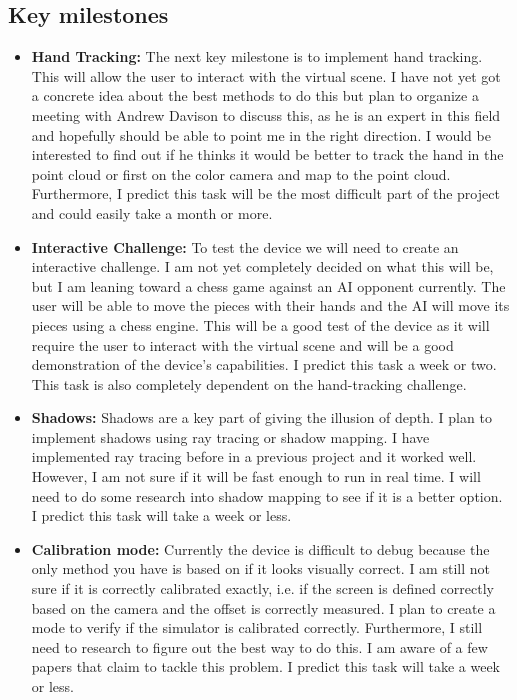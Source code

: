 \subsection{Key milestones}
\begin{itemize}
    \item \textbf{Hand Tracking:} The next key milestone is to implement hand tracking. This will allow the user to interact with the virtual scene. I have not yet got a concrete idea about the best methods to do this but plan to organize a meeting with Andrew Davison to discuss this, as he is an expert in this field and hopefully should be able to point me in the right direction. I would be interested to find out if he thinks it would be better to track the hand in the point cloud or first on the color camera and map to the point cloud. Furthermore, I predict this task will be the most difficult part of the project and could easily take a month or more.

    \item \textbf{Interactive Challenge:} To test the device we will need to create an interactive challenge. I am not yet completely decided on what this will be, but I am leaning toward a chess game against an AI opponent currently. The user will be able to move the pieces with their hands and the AI will move its pieces using a chess engine. This will be a good test of the device as it will require the user to interact with the virtual scene and will be a good demonstration of the device's capabilities. I predict this task a week or two. This task is also completely dependent on the hand-tracking challenge.

    \item \textbf{Shadows:} Shadows are a key part of giving the illusion of depth. I plan to implement shadows using ray tracing or shadow mapping. I have implemented ray tracing before in a previous project and it worked well. However, I am not sure if it will be fast enough to run in real time. I will need to do some research into shadow mapping to see if it is a better option. I predict this task will take a week or less.

    \item \textbf{Calibration mode:} Currently the device is difficult to debug because the only method you have is based on if it looks visually correct. I am still not sure if it is correctly calibrated exactly, i.e. if the screen is defined correctly based on the camera and the offset is correctly measured. I plan to create a mode to verify if the simulator is calibrated correctly. Furthermore, I still need to research to figure out the best way to do this. I am aware of a few papers that claim to tackle this problem. I predict this task will take a week or less.


\end{itemize}
